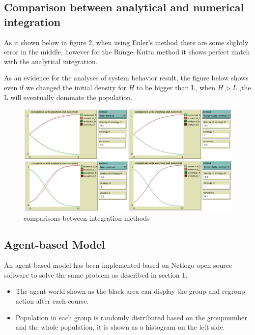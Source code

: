 \documentclass[a4paper, 12pt]{article}
\begin{document}
\subsection{Comparison between analytical and numerical integration} 
As it shown below in figure 2, when using Euler's method there are some slightly error in the middle, however for the Runge–Kutta method it shows perfect match with the analytical integration.
\par As an evidence for the analyses of system behavior result, the figure below shows even if we changed the initial density for $H$ to be bigger than L, when $H>L$ ,the L will eventually dominate the population. 
\begin{figure}[!h]
  \centering
  \includegraphics[width=6in]{./figures/comp}
  \vspace{-1mm}
  \caption{\footnotesize comparisons between integration methods}
  \label{comparison}
\end{figure}
\vspace{-3mm}

\subsection{Agent-based Model}
An agent-based model has been implemented based on Netlogo open source software to solve the same problem as described in section 1. 
\begin{itemize}[nolistsep]
	\item The agent world shown as the black area can display the group and regroup action after each course. 
	\item Population in each group is randomly distributed based on the groupnumber and the whole population, it is shown as a histogram on the left side.
\end{itemize}
\end{document}
